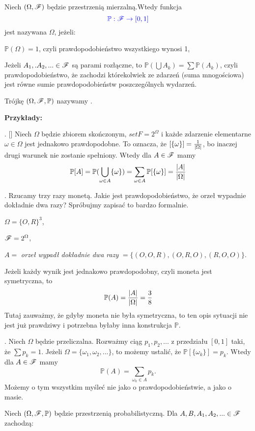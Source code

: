 Niech $(\Omega,\mathcal{F})$ będzie przestrzenią mierzalną.Wtedy funkcja
$$\color{blue}\mathbb{P}:\mathcal{F}\to[0,1]$$
jest nazywana  $\Omega$, jeżeli:

\indent \point $\mathbb{P}(\Omega)=1$, czyli prawdopodobieństwo wszystkiego wynosi 1,

\indent \point Jeżeli $A_1,.A_2,...\in\mathcal{F}$ są parami rozłączne, to $\mathbb{P}\left(\bigcup A_k\right)=\sum\mathbb{P}(A_k)$, czyli prawdopodobieństwo, że zachodzi którekolwiek ze zdarzeń (suma mnogościowa) jest równe sumie prawdopodobieństw poszczególnych wydarzeń.

Trójkę $(\Omega, \mathcal{F},\mathbb{P})$ nazywamy .
\medskip

\textbf{\large Przykłady:}

. [] Niech $\Omega$ będzie zbiorem skończonym, $set{F}=2^{\Omega}$ i każde zdarzenie elementarne $\omega\in\Omega$ jest jednakowo prawdopodobne. To oznacza, że $\mathbb[\{\omega\}]={1\over|\Omega|}$, bo inaczej drugi warunek nie zostanie spełniony. Wtedy dla $A\in \mathcal{F}$ mamy 
$$\mathbb{P}[A]=\mathbb{P}(\bigcup_{\omega\in A}\{\omega\})=\sum_{\omega\in A}\mathbb{P}[\{\omega\}]={|A|\over|\Omega|}$$

. Rzucamy trzy razy monetą. Jakie jest prawdopodobieństwo, że orzeł wypadnie dokładnie dwa razy? Spróbujmy zapisać to bardzo formalnie. 

$\Omega=\{O,R\}^3$,

$\mathcal{F}=2^\Omega$, 

$A=$\emph{ orzeł wypadł dokładnie dwa razy }$=\{(O, O, R), (O, R, O), (R, O, O)\}$.

Jeżeli każdy wynik jest jednakowo prawdopodobny, czyli moneta jest symetryczna, to
$$\mathbb{P}(A)={|A|\over|\Omega|}={3\over 8}$$
Tutaj zauważmy, że gdyby moneta nie była symetryczna, to ten opis sytuacji nie jest już prawdziwy i potrzebna byłaby inna konstrukcja $\mathbb{P}$.

. Niech $\Omega$ będzie przeliczalna. Rozważmy ciąg $p_1,p_2,...$ z przedziału $[0,1]$ taki, że $\sum p_k=1$. Jeżeli $\Omega=\{\omega_1,\omega_2,...\}$, to możemy ustalić, że $\mathbb{P}[\{\omega_k\}]=p_k$. Wtedy dla $A\in\mathcal{F}$ mamy
$$\mathbb{P}(A)=\sum_{\omega_k\in A}p_k.$$
Możemy o tym wszystkim myśleć nie jako o prawdopodobieństwie, a jako o masie.
\medskip

\medskip

 Niech $(\Omega,\mathcal{F},\mathbb{P})$ będzie przestrzenią probabilistyczną. Dla $A, B, A_1, A_2,...\in\mathcal{F}$ zachodzą:

